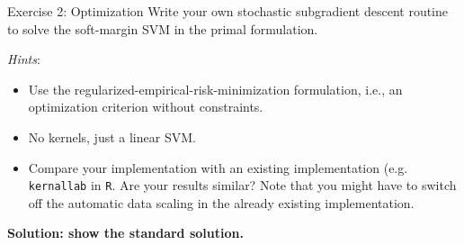 \documentclass[aspectratio=169]{beamer}
\begin{document}
%	


%

\begin{frame}{Exercise 2: Optimization}
	Write your own stochastic subgradient descent routine to solve the soft-margin SVM in the primal formulation.
	
	\emph{Hints}:
	\begin{itemize}
		\item Use the regularized-empirical-risk-minimization formulation, i.e., an optimization criterion without constraints.
		\item No kernels, just a linear SVM.
		\item Compare your implementation with an existing implementation (e.g. \texttt{kernallab} in \texttt{R}. Are your results similar? Note that you might have to switch off the automatic data scaling in the already existing implementation.
	\end{itemize}
	
	\textbf{Solution: show the standard solution.}
\end{frame}
\end{document}
